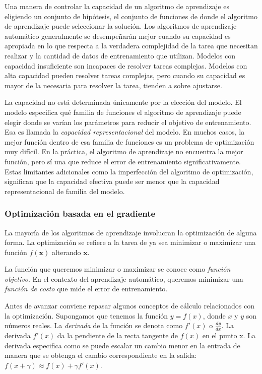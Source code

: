 Una manera de controlar la capacidad de un algoritmo de aprendizaje es
eligiendo un conjunto de hipótesis, el conjunto de funciones de donde el
algoritmo de aprendizaje puede seleccionar la solución. 
Los algoritmos de aprendizaje automático generalmente se desempeñarán
mejor cuando su capacidad es apropiada en lo que respecta a la verdadera
complejidad de la tarea que necesitan realizar y la cantidad de datos de
entrenamiento que utilizan. Modelos con capacidad insuficiente son
incapaces de resolver tareas complejas. Modelos con alta capacidad
pueden resolver tareas complejas, pero cuando su capacidad es mayor de
la necesaria para resolver la tarea, tienden a sobre ajustarse.

La capacidad no está determinada únicamente por la elección del modelo.
El modelo especifica qué familia de funciones el algoritmo de
aprendizaje puede elegir donde se varían los parámetros para reducir el
objetivo de entrenamiento. Esa es llamada la \textit{capacidad representacional}
del modelo. En muchos casos, la mejor función dentro de esa familia de
funciones es un problema de optimización muy difícil. En la práctica, el
algoritmo de aprendizaje no encuentra la mejor función, pero sí una que
reduce el error de entrenamiento significativamente. Estas limitantes
adicionales como la imperfección del algoritmo de optimización,
significan que la capacidad efectiva puede ser menor que la capacidad
representacional de familia del modelo.


\subsubsection{Optimización basada en el gradiente}

La mayoría de los algoritmos de aprendizaje involucran la optimización 
de alguna forma. La optimización se refiere a la tarea de ya sea 
minimizar o maximizar una función $f(\mathbf{x})$ alterando $\mathbf{x}$.

La función que queremos minimizar o maximizar se conoce como \textit{función objetivo}.
En el contexto del aprendizaje automático, queremos minimizar una \textit{función
de costo} que mide el error de entrenamiento. 

Antes de avanzar conviene repasar algunos conceptos de cálculo
relacionados con la optimización.
Supongamos que tenemos la función $y = f(x)$, donde $x$ y $y$ son números reales.
La \textit{derivada} de la función se denota como $f'(x)$ o $\frac{dy}{dx}$.
La derivada $f'(x)$ da la pendiente de la recta tangente de $f(x)$ en el punto x.
La derivada
especifica como se puede escalar un cambio menor en la entrada de manera que se obtenga
el cambio correspondiente en la salida: $f(x + \gamma) \approx f(x) + \gamma f'(x)$.

